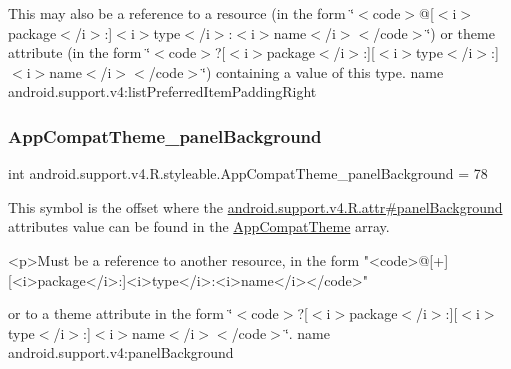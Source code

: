 This may also be a reference to a resource (in the form \char`\"{}$<$code$>$@\mbox{[}$<$i$>$package$<$/i$>$\+:\mbox{]}$<$i$>$type$<$/i$>$\+:$<$i$>$name$<$/i$>$$<$/code$>$\char`\"{}) or theme attribute (in the form \char`\"{}$<$code$>$?\mbox{[}$<$i$>$package$<$/i$>$\+:\mbox{]}\mbox{[}$<$i$>$type$<$/i$>$\+:\mbox{]}$<$i$>$name$<$/i$>$$<$/code$>$\char`\"{}) containing a value of this type.  name android.\+support.\+v4\+:list\+Preferred\+Item\+Padding\+Right \mbox{\label{classandroid_1_1support_1_1v4_1_1R_1_1styleable_a9a25be61219ea77461c9e13d61a6eb9c}} 
\subsubsection{\texorpdfstring{App\+Compat\+Theme\+\_\+panel\+Background}{AppCompatTheme\_panelBackground}}
{\footnotesize\ttfamily int android.\+support.\+v4.\+R.\+styleable.\+App\+Compat\+Theme\+\_\+panel\+Background = 78\hspace{0.3cm}{\ttfamily [static]}}

This symbol is the offset where the \hyperlink{classandroid_1_1support_1_1v4_1_1R_1_1attr_a7dd979fca50e7d1b3cf5eb905807904d}{android.\+support.\+v4.\+R.\+attr\#panel\+Background} attribute\textquotesingle{}s value can be found in the \hyperlink{classandroid_1_1support_1_1v4_1_1R_1_1styleable_ac07ebbe62ed977f6dcaadc6397840ace}{App\+Compat\+Theme} array.

\begin{DoxyVerb}      <p>Must be a reference to another resource, in the form "<code>@[+][<i>package</i>:]<i>type</i>:<i>name</i></code>"
\end{DoxyVerb}
 or to a theme attribute in the form \char`\"{}$<$code$>$?\mbox{[}$<$i$>$package$<$/i$>$\+:\mbox{]}\mbox{[}$<$i$>$type$<$/i$>$\+:\mbox{]}$<$i$>$name$<$/i$>$$<$/code$>$\char`\"{}.  name android.\+support.\+v4\+:panel\+Background \mbox{\label{classandroid_1_1support_1_1v4_1_1R_1_1styleable_a70447b234629ffb93fa09bdc74f87251}} 
